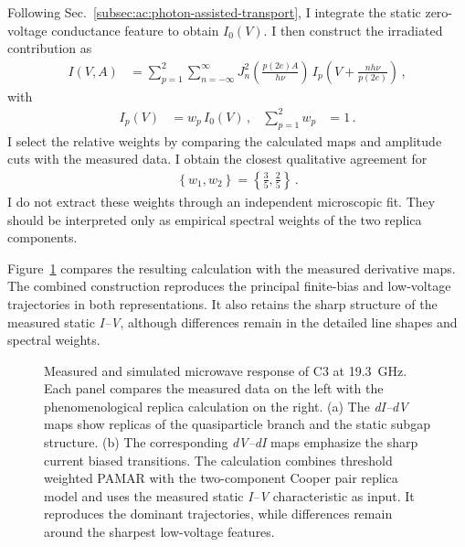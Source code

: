         Following Sec.~\ref{subsec:ac:photon-assisted-transport}, I integrate the static zero-voltage conductance feature to obtain $I_0(V)$. I then construct the irradiated contribution as
        \begin{align}
            I\!(V,A) &=
                \sum_{p=1}^{2}\sum_{n=-\infty}^\infty
                J_n^2\!\left(\frac{p(2e)A}{h\nu}\right)\,
                I_p\!\left(V+\frac{nh\nu}{p(2e)}\right)\,,
            \label{eq:ac:contact3:fractional-paicpt}
        \end{align}
        with
        \begin{align}
            I_p(V) &= w_p\,I_0(V)\,, &
            \sum_{p=1}^{2} w_p &= 1\,.
            \label{eq:ac:contact3:fractional-weights}
        \end{align}
        I select the relative weights by comparing the calculated maps and amplitude cuts with the measured data. I obtain the closest qualitative agreement for
        \begin{align}
            \left\{w_1,w_2\right\}=\left\{\tfrac{3}{5},\tfrac{2}{5}\right\}\,.
            \label{eq:ac:contact3:fractional-weight-values}
        \end{align}
        I do not extract these weights through an independent microscopic fit. They should be interpreted only as empirical spectral weights of the two replica components.

        Figure~\ref{fig:ac:contact3:comparison} compares the resulting calculation with the measured derivative maps. The combined construction reproduces the principal finite-bias and low-voltage trajectories in both representations. It also retains the sharp structure of the measured static \textit{I--V}, although differences remain in the detailed line shapes and spectral weights.

        \begin{figure}[t]
            \centering
            \hfill
            \caption{
                Measured and simulated microwave response of C3 at \qty{19.3}{\giga\hertz}. Each panel compares the measured data on the left with the phenomenological replica calculation on the right. (a) The \textit{dI--dV} maps show replicas of the quasiparticle branch and the static subgap structure. (b) The corresponding \textit{dV--dI} maps emphasize the sharp current biased transitions. The calculation combines threshold weighted PAMAR with the two-component Cooper pair replica model and uses the measured static \textit{I--V} characteristic as input. It reproduces the dominant trajectories, while differences remain around the sharpest low-voltage features.
            }
            \label{fig:ac:contact3:comparison}
        \end{figure}

